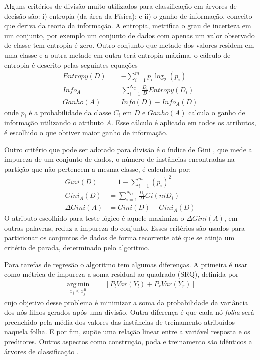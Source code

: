 Alguns critérios de divisão muito utilizados para classificação em árvores de decisão são: i) entropia (da área da Física); e ii) o ganho de informação, conceito que deriva da teoria da informação. A entropia, metrifica o grau de incerteza em um conjunto, por exemplo um conjunto de dados com apenas um valor observado de classe tem entropia é zero. Outro conjunto que metade dos valores residem em uma classe e a outra metade em outra terá entropia máxima, o cálculo de entropia \cite{HanKamber2011} é descrito pelas seguintes equações
\begin{align}
Entropy(D) &= - \sum\limits_{i=1}^{m}p_{i}\log_{2}(p_{i})\label{EQ_Entropia_Ganho_Informacao} \\
Info_{A} &= \sum\limits_{i=1}^{N_{C}}\frac{D_{i}}{D}Entropy(D_{i})\label{EQ_Informacao_AtributoA_Ganho_Informacao}\\
Ganho(A) &= Info(D) - Info_{A}(D)\label{EQ_Ganho_Ganho_Informacao}
\end{align}
onde \(p_{i}\) é a probabilidade da classe \(C_{i}\) em \(D\) e \(Ganho(A)\) calcula o ganho de informação utilizando o atributo \(A\). Esse cálculo é aplicado em todos os atributos, é escolhido o que obtiver maior ganho de informação.

Outro critério que pode ser adotado para divisão é o índice de Gini \cite{HanKamber2011}, que mede a impureza de um conjunto de dados, o número de instâncias encontradas na partição que não pertencem a mesma classe, é calculada por:
\begin{align}
Gini(D) &= 1 - \sum\limits_{i=1}^{m}(p_{i})^{2}\label{EQ_Gini_01} \\
Gini_{A}(D) &= \sum\limits_{i=1}^{N_{C}}\frac{D_{i}}{D}Gi(niD_{i})\label{EQ_Gini_02} \\
\Delta Gini(A) &= Gini(D) - Gini_{A}(D)\label{EQ_Gini_03}
\end{align}
O atributo escolhido para teste lógico é aquele maximiza o \(\Delta Gini(A)\), em outras palavras, reduz a impureza do conjunto. Esses critérios são usados para particionar os conjuntos de dados de forma recorrente até que se atinja um critério de parada, determinado pelo algoritmo. 

Para tarefas de regresão o algoritmo tem algumas diferenças. A primeira é usar como métrica de impureza a soma residual ao quadrado (SRQ), definida por
\begin{align}
\operatorname*{arg\,min}_{x_{j} \leq x_{j}^{R}} \qquad [P_{l}Var(Y_{l}) + P_{r}Var(Y_{r})]
\end{align}
cujo objetivo desse problema é minimizar a soma da probabilidade da variância dos nós filhos gerados após uma divisão. Outra diferença é que cada nó \emph{folha} será preenchido pela média dos valores das instâncias de treinamento atribuídos naquela folha. E por fim, supõe uma relação linear entre a variável resposta e os preditores. Outros aspectos como construção, poda e treinamento são idênticos a árvores de classificação \cite{Connor2007}.


